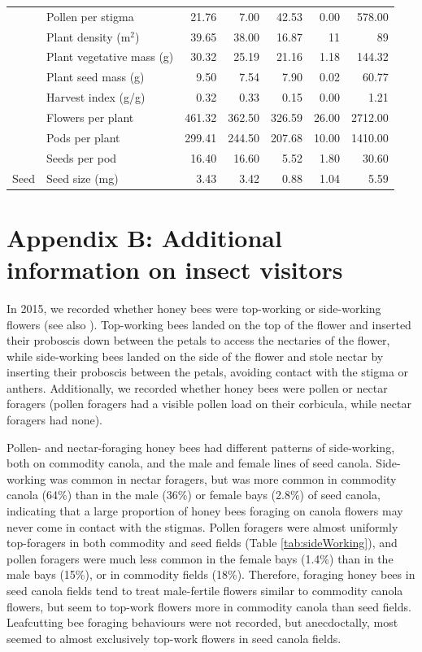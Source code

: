 \documentclass[12pt]{article} %
\begin{document}
\begin{table}[h]
\begin{tabular}{l|l|r|r|r|r|r}
\cline{2-7}
 & Pollen per stigma & 21.76 & 7.00 & 42.53 & 0.00 & 578.00\\
\cline{2-7}
 & Plant density (m$^2$) & 39.65 & 38.00 & 16.87 & 11 & 89\\
\cline{2-7}
 & Plant vegetative mass (g) & 30.32 & 25.19 & 21.16 & 1.18 & 144.32\\
\cline{2-7}
 & Plant seed mass (g) & 9.50 & 7.54 & 7.90 & 0.02 & 60.77\\
\cline{2-7}
 & Harvest index (g/g) & 0.32 & 0.33 & 0.15 & 0.00 & 1.21\\
\cline{2-7}
 & Flowers per plant & 461.32 & 362.50 & 326.59 & 26.00 & 2712.00\\
\cline{2-7}
 & Pods per plant & 299.41 & 244.50 & 207.68 & 10.00 & 1410.00\\
\cline{2-7}
 & Seeds per pod & 16.40 & 16.60 & 5.52 & 1.80 & 30.60\\
\cline{2-7}
\multirow{-15}{*}{\raggedright\arraybackslash Seed} & Seed size (mg) & 3.43 & 3.42 & 0.88 & 1.04 & 5.59\\
\hline
\end{tabular}
\end{table}

\clearpage

\section*{Appendix B: Additional information on insect visitors}

In 2015, we recorded whether honey bees were top-working or side-working flowers (see also \citealp{free1973, free1983, mohr1988}).
Top-working bees landed on the top of the flower and inserted their proboscis down between the petals to access the nectaries of the flower, while side-working bees landed on the side of the flower and stole nectar by inserting their proboscis between the petals, avoiding contact with the stigma or anthers. 
Additionally, we recorded whether honey bees were pollen or nectar foragers (pollen foragers had a visible pollen load on their corbicula, while nectar foragers had none).

Pollen- and nectar-foraging honey bees had different patterns of side-working, both on commodity canola, and the male and female lines of seed canola.
Side-working was common in nectar foragers, but was more common in commodity canola (64\%) than in the male (36\%) or female bays (2.8\%) of seed canola, indicating that a large proportion of honey bees foraging on canola flowers may never come in contact with the stigmas.
Pollen foragers were almost uniformly top-foragers in both commodity and seed fields (Table \ref{tab:sideWorking}), and pollen foragers were much less common in the female bays (1.4\%) than in the male bays (15\%), or in commodity fields (18\%).
Therefore, foraging honey bees in seed canola fields tend to treat male-fertile flowers similar to commodity canola flowers, but seem to top-work flowers more in commodity canola than seed fields.
Leafcutting bee foraging behaviours were not recorded, but anecdoctally, most seemed to almost exclusively top-work flowers in seed canola fields.
\end{document}
